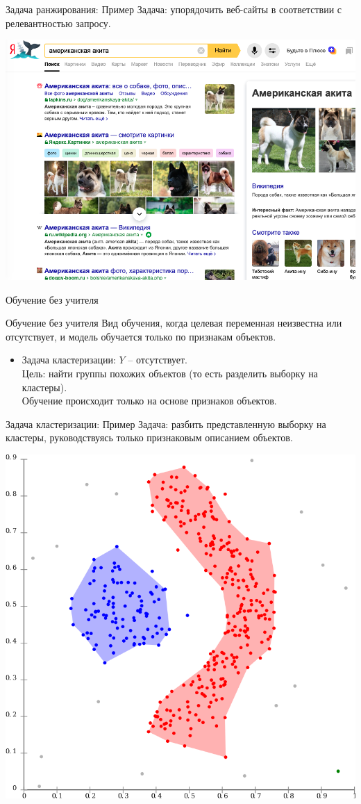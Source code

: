 \documentclass[c, handout]{beamer} %
\begin{document}
	\begin{frame}{Задача ранжирования: Пример}
		Задача: упорядочить веб-сайты в соответствии с релевантностью запросу.
		
		\begin{center}
			\includegraphics[width=0.8\linewidth]{r.png}
		\end{center}
	\end{frame}

	\begin{frame}{Обучение без учителя}
		\begin{block}{Обучение без учителя}
			Вид обучения, когда целевая переменная неизвестна или отсутствует, и модель обучается только по признакам объектов.  
		\end{block}
	\begin{itemize}
		\item Задача кластеризации: $Y$ – отсутствует. \\
		\vspace{1em}
		Цель: найти группы похожих объектов (то есть разделить выборку на кластеры). \\
		\vspace{1em}
		Обучение происходит только на основе признаков объектов.
	\end{itemize}
	\end{frame}

\begin{frame}{Задача кластеризации: Пример}
	Задача: разбить представленную выборку на кластеры, руководствуясь только признаковым описанием объектов.
	
	\begin{center}
		\href{https://en.wikipedia.org/wiki/Cluster_analysis}{\includegraphics[width=0.5\linewidth]{cl.png}}
	\end{center}
\end{frame}
\end{document}
